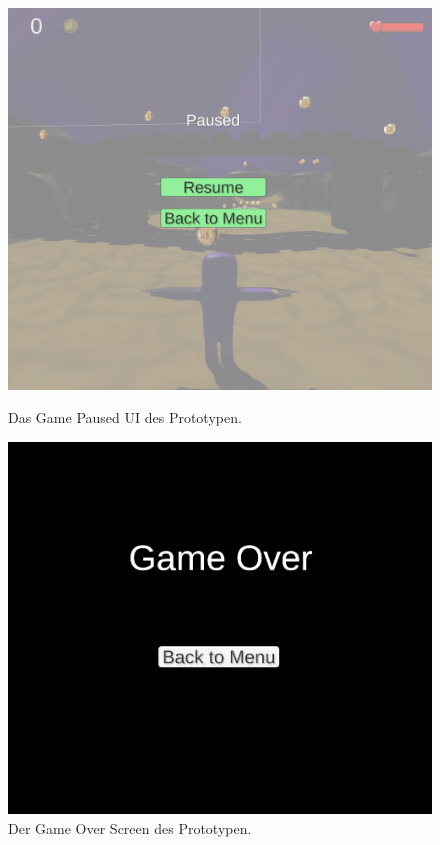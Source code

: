 \begin{figure}[H]
    \centering
    \begin{minipage}{0.4\textwidth}
        \centering
        \includegraphics[width=\linewidth]{chapters/03/images/GamePaused.png}
        \caption{Das Game Paused UI des Prototypen.}
        \label{UI01}
    \end{minipage}
    \hspace{1cm}
    \begin{minipage}{0.4\textwidth}
        \centering
        \includegraphics[width=\linewidth]{chapters/03/images/GameOver.png}
        \caption{Der Game Over Screen des Prototypen.}
        \label{UI02}
    \end{minipage}
\end{figure}



